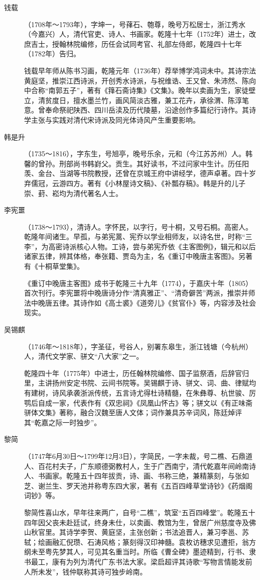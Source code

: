 \begin{description}
  \item[钱载] （1708年～1793年），字坤一，号萚石、匏尊，晚号万松居士，浙江秀水（今嘉兴）人，清代官吏、诗人、书画家。乾隆十七年（1752年）进士，改庶吉士，授翰林院编修，历任会试同考官、礼部左侍郎，乾隆四十七年（1782年）告归。\par
        钱载早年师从陈书习画，乾隆元年（1736年）荐举博学鸿词未中。其诗宗法黄庭坚，推崇江西诗派，开创秀水诗派，与祝维诰、王又曾、朱沛然、陈向中合称“南郭五子”，著有《箨石斋诗集》《文集》。晚年以卖画为生，家徒壁立，清贫度日，擅水墨兰竹，画风简淡古雅，兼工花卉，承徐渭、陈淳笔意。曾奉命祭祀陕西、四川岳渎及历代陵墓，沿途创作多篇纪行诗作。其诗学主张与实践对清代宋诗派及同光体诗风产生重要影响。
  \item[韩是升] （1735～1816），字东生，号旭亭，晚号乐余，元和（今江苏苏州）人。韩馨的曾孙。刑部尚书韩崶父。贡生。其好读书，不过问家中生计。历任阳羡、金台、当湖等书院教授，还曾在京城王府中讲经学，德声卓著。四十岁弃儒冠，云游四方。著有《小林屋诗文稿》、《补瓢存稿》。韩是升的儿子崇、葑、崧均为清代著名人士。
  \item[李宪噩] （1738～1793），清诗人。字怀民，以字行，号十桐，又号石桐。高密人。乾隆年间诸生。早孤，与弟宪暠、宪乔以学业相师友，以诗名世，时称“三李”，为高密诗派核心人物。工诗，尝与弟宪乔依《主客图例》，辑元和以后诸家五律，辨其体格，奉张籍、贾岛为主，名《重订中晚唐主客图》。另著有《十桐草堂集》。\par
        《重订中晚唐主客图》成书于乾隆三十九年（1774），于嘉庆十年（1805）首次刊行。李宪噩将中晚唐诗分作“清真雅正”、“清奇僻苦”两派，推崇并师法中晚唐五律。其诗作如《高士裘》《道旁儿》《贫官仆》等，内容涉及社会现实。
  \item[吴锡麒] （1746年～1818年），字圣征，号谷人，别署东皋生，浙江钱塘（今杭州）人，清代文学家、骈文“八大家”之一。\par
        乾隆四十年（1775年）中进士，历任翰林院编修、国子监祭酒，后辞官归里，主讲扬州安定书院、云间书院等。吴锡麒于诗、骈文、词、曲、律赋均有建树，诗风承袭浙派传统，五言诗尤得杜诗精髓，在朱彝尊、杭世骏、厉鹗后自成一家，代表作有《双忠祠》《凤凰山怀古》等；骈文以《有正味斋骈体文集》著称，融合汉魏至唐人文体；词作兼具苏辛词风，陈廷焯评其“乾嘉之际一时独步”。
  \item[黎简] （1747年6月30日～1799年12月3日），字简民，一字未裁，号二樵、石鼎道人、百花村夫子，广东顺德弼教村人，生于广西南宁，清代乾嘉年间岭南诗人、书画家。乾隆五十四年拔贡，诗、画、书称三绝，兼精篆刻，与张如芝、谢兰生、罗天池并称粤东四大家，著有《五百四峰草堂诗钞》《药烟阁词钞》等。\par
        黎简性喜山水，早年往来两广，自号“二樵”，筑室“五百四峰堂”。乾隆五十四年因父丧未赴廷试，终身未仕，以卖画、教馆为生，曾居广州慈度寺及佛山秋官里。其诗学李贺、黄庭坚，主张创新；书法追晋人，兼习李邕、苏轼；绘画融汇倪瓒、石涛风格；篆刻得汉印神髓。袁枚访穗求见遭拒，翁方纲未至粤先梦其人，可见其名重当时。所临《曹全碑》墨迹精到，行书、隶书最工，康有为列为清代广东书法大家。梁启超评其诗歌“写物言情能发前人所未发”，钱仲联称其诗可独步岭南。

\end{description}

